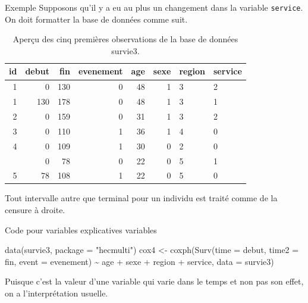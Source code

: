 \documentclass[
  ignorenonframetext,
]{beamer}
\newenvironment{Shaded}{\begin{snugshade}}{\end{snugshade}}
\newcommand{\AttributeTok}[1]{\textcolor[rgb]{0.40,0.45,0.13}{#1}}
\newcommand{\FunctionTok}[1]{\textcolor[rgb]{0.28,0.35,0.67}{#1}}
\newcommand{\NormalTok}[1]{\textcolor[rgb]{0.00,0.23,0.31}{#1}}
\newcommand{\OtherTok}[1]{\textcolor[rgb]{0.00,0.23,0.31}{#1}}
\newcommand{\SpecialCharTok}[1]{\textcolor[rgb]{0.37,0.37,0.37}{#1}}
\newcommand{\StringTok}[1]{\textcolor[rgb]{0.13,0.47,0.30}{#1}}
\begin{document}
\begin{frame}[fragile]{Exemple}
\protect\hypertarget{exemple}{}
Supposons qu'il y a eu au plus un changement dans la variable
\texttt{service}. On doit formatter la base de données comme suit.

\footnotesize

\hypertarget{tbl-survie3-donnees}{}
\begin{table}
\caption{\label{tbl-survie3-donnees}Aperçu des cinq premières observations de la base de données survie3. }\tabularnewline

\centering
\begin{tabular}{rrrrrrll}
\toprule
id & debut & fin & evenement & age & sexe & region & service\\
\midrule
1 & 0 & 130 & 0 & 48 & 1 & 3 & 2\\
1 & 130 & 178 & 0 & 48 & 1 & 3 & 1\\
2 & 0 & 159 & 0 & 31 & 1 & 3 & 2\\
3 & 0 & 110 & 1 & 36 & 1 & 4 & 0\\
4 & 0 & 109 & 1 & 30 & 0 & 2 & 0\\
\addlinespace
5 & 0 & 78 & 0 & 22 & 0 & 5 & 1\\
5 & 78 & 108 & 1 & 22 & 0 & 5 & 0\\
\bottomrule
\end{tabular}
\end{table}

Tout intervalle autre que terminal pour un individu est traité comme de
la censure à droite.

\normalsize
\end{frame}

\begin{frame}[fragile]{Code pour variables explicatives variables}
\protect\hypertarget{code-pour-variables-explicatives-variables}{}
\begin{Shaded}
\begin{Highlighting}[numbers=left,,]
\FunctionTok{data}\NormalTok{(survie3, }\AttributeTok{package =} \StringTok{"hecmulti"}\NormalTok{)}
\NormalTok{cox4 }\OtherTok{\textless{}{-}} \FunctionTok{coxph}\NormalTok{(}\FunctionTok{Surv}\NormalTok{(}\AttributeTok{time =}\NormalTok{ debut, }
                   \AttributeTok{time2 =}\NormalTok{ fin, }
                   \AttributeTok{event =}\NormalTok{ evenement) }\SpecialCharTok{\textasciitilde{}} 
\NormalTok{                age }\SpecialCharTok{+}\NormalTok{ sexe }\SpecialCharTok{+}\NormalTok{ region }\SpecialCharTok{+}\NormalTok{ service, }
              \AttributeTok{data =}\NormalTok{ survie3)}
\end{Highlighting}
\end{Shaded}

\footnotesize

Puisque c'est la valeur d'une variable qui varie dans le temps et non
pas son effet, on a l'interprétation usuelle.

\normalsize
\end{frame}
\end{document}
